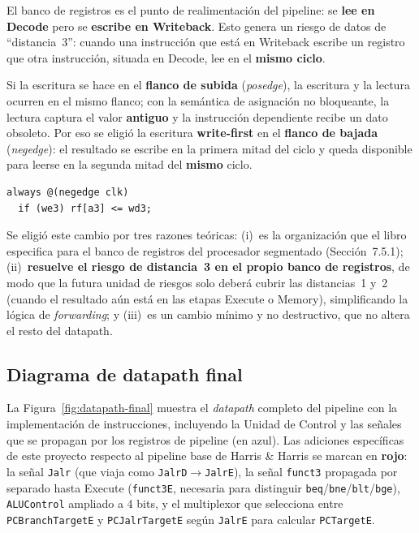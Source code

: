 \documentclass[11pt,a4paper]{article}
\begin{document}
El banco de registros es el punto de realimentación del pipeline: se \textbf{lee en
	Decode} pero se \textbf{escribe en Writeback}. Esto genera un riesgo de datos de
``distancia~3'': cuando una instrucción que está en Writeback escribe un registro que
otra instrucción, situada en Decode, lee en el \textbf{mismo ciclo}.

Si la escritura se hace en el \textbf{flanco de subida} (\textit{posedge}), la
escritura y la lectura ocurren en el mismo flanco; con la semántica de asignación no
bloqueante, la lectura captura el valor \textbf{antiguo} y la instrucción dependiente
recibe un dato obsoleto. Por eso se eligió la escritura \textbf{write-first} en el
\textbf{flanco de bajada} (\textit{negedge}): el resultado se escribe en la primera
mitad del ciclo y queda disponible para leerse en la segunda mitad del \textbf{mismo}
ciclo.

\begin{lstlisting}
always @(negedge clk)
  if (we3) rf[a3] <= wd3;
\end{lstlisting}

Se eligió este cambio por tres razones teóricas: (i)~es la organización que el libro
especifica para el banco de registros del procesador segmentado (Sección~7.5.1);
(ii)~\textbf{resuelve el riesgo de distancia~3 en el propio banco de registros}, de
modo que la futura unidad de riesgos solo deberá cubrir las distancias~1 y~2 (cuando el
resultado aún está en las etapas Execute o Memory), simplificando la lógica de
\textit{forwarding}; y (iii)~es un cambio mínimo y no destructivo, que no altera el
resto del datapath.

\subsection{Diagrama de datapath final}

La Figura~\ref{fig:datapath-final} muestra el \textit{datapath} completo del
pipeline con la implementación de instrucciones, incluyendo la Unidad de Control y
las señales que se propagan por los registros de pipeline (en azul). Las
adiciones específicas de este proyecto respecto al pipeline base de Harris \&
Harris se marcan en \textbf{rojo}: la señal \texttt{Jalr} (que viaja como
\texttt{JalrD}$\to$\texttt{JalrE}), la señal \texttt{funct3} propagada por
separado hasta Execute (\texttt{funct3E}, necesaria para distinguir
\texttt{beq}/\texttt{bne}/\texttt{blt}/\texttt{bge}), \texttt{ALUControl}
ampliado a 4 bits, y el multiplexor que selecciona entre
\texttt{PCBranchTargetE} y \texttt{PCJalrTargetE} según \texttt{JalrE} para
calcular \texttt{PCTargetE}.
\end{document}
